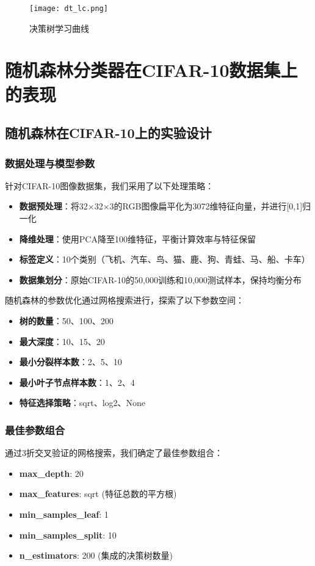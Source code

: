 \documentclass[UTF8]{report}
\theoremstyle{MyLineTheoremStyle} %
\theoremstyle{MyBlockTheoremStyle} %
\theoremstyle{MySubsubsectionStyle} %
\begin{document}
\begin{figure}[H]
    \centering
    \texttt{[image: dt\_lc.png]}
    \caption{决策树学习曲线}
    \label{fig:dt_learning_curve}
\end{figure}





\section{随机森林分类器在CIFAR-10数据集上的表现}

\subsection{随机森林在CIFAR-10上的实验设计}

\subsubsection{数据处理与模型参数}
针对CIFAR-10图像数据集，我们采用了以下处理策略：

\begin{itemize}
    \item \textbf{数据预处理}：将32×32×3的RGB图像扁平化为3072维特征向量，并进行[0,1]归一化
    \item \textbf{降维处理}：使用PCA降至100维特征，平衡计算效率与特征保留
    \item \textbf{标签定义}：10个类别（飞机、汽车、鸟、猫、鹿、狗、青蛙、马、船、卡车）
    \item \textbf{数据集划分}：原始CIFAR-10的50,000训练和10,000测试样本，保持均衡分布
\end{itemize}

随机森林的参数优化通过网格搜索进行，探索了以下参数空间：
\begin{itemize}
    \item \textbf{树的数量}：50、100、200
    \item \textbf{最大深度}：10、15、20
    \item \textbf{最小分裂样本数}：2、5、10
    \item \textbf{最小叶子节点样本数}：1、2、4
    \item \textbf{特征选择策略}：sqrt、log2、None
\end{itemize}

\subsubsection{最佳参数组合}
通过3折交叉验证的网格搜索，我们确定了最佳参数组合：
\begin{itemize}
    \item \textbf{max\_depth}: 20
    \item \textbf{max\_features}: sqrt (特征总数的平方根)
    \item \textbf{min\_samples\_leaf}: 1
    \item \textbf{min\_samples\_split}: 10
    \item \textbf{n\_estimators}: 200 (集成的决策树数量)
\end{itemize}
\end{document}
